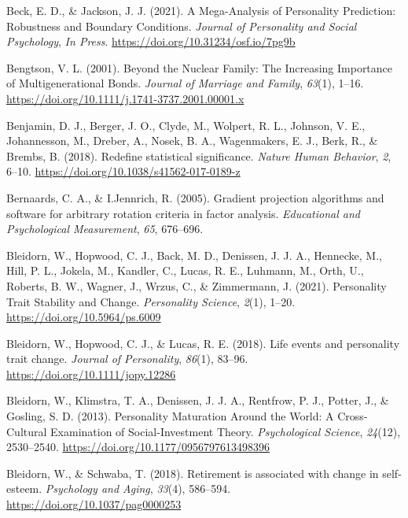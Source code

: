 \documentclass[
  english,
  man,floatsintext]{apa7}
\begin{document}
\leavevmode\hypertarget{ref-beckMegaAnalysisPersonalityPrediction2021}{}%
Beck, E. D., \& Jackson, J. J. (2021). A Mega-Analysis of Personality Prediction: Robustness and Boundary Conditions. \emph{Journal of Personality and Social Psychology}, \emph{In Press}. \url{https://doi.org/10.31234/osf.io/7pg9b}

\leavevmode\hypertarget{ref-bengtsonNuclearFamilyIncreasing2001}{}%
Bengtson, V. L. (2001). Beyond the Nuclear Family: The Increasing Importance of Multigenerational Bonds. \emph{Journal of Marriage and Family}, \emph{63}(1), 1--16. \url{https://doi.org/10.1111/j.1741-3737.2001.00001.x}

\leavevmode\hypertarget{ref-benjaminRedefineStatisticalSignificance2018}{}%
Benjamin, D. J., Berger, J. O., Clyde, M., Wolpert, R. L., Johnson, V. E., Johannesson, M., Dreber, A., Nosek, B. A., Wagenmakers, E. J., Berk, R., \& Brembs, B. (2018). Redefine statistical significance. \emph{Nature Human Behavior}, \emph{2}, 6--10. \url{https://doi.org/10.1038/s41562-017-0189-z}

\leavevmode\hypertarget{ref-R-GPArotation}{}%
Bernaards, C. A., \& I.Jennrich, R. (2005). Gradient projection algorithms and software for arbitrary rotation criteria in factor analysis. \emph{Educational and Psychological Measurement}, \emph{65}, 676--696.

\leavevmode\hypertarget{ref-bleidornPersonalityTraitStability2021}{}%
Bleidorn, W., Hopwood, C. J., Back, M. D., Denissen, J. J. A., Hennecke, M., Hill, P. L., Jokela, M., Kandler, C., Lucas, R. E., Luhmann, M., Orth, U., Roberts, B. W., Wagner, J., Wrzus, C., \& Zimmermann, J. (2021). Personality Trait Stability and Change. \emph{Personality Science}, \emph{2}(1), 1--20. \url{https://doi.org/10.5964/ps.6009}

\leavevmode\hypertarget{ref-bleidornLifeEventsPersonality2018}{}%
Bleidorn, W., Hopwood, C. J., \& Lucas, R. E. (2018). Life events and personality trait change. \emph{Journal of Personality}, \emph{86}(1), 83--96. \url{https://doi.org/10.1111/jopy.12286}

\leavevmode\hypertarget{ref-bleidornPersonalityMaturationWorld2013}{}%
Bleidorn, W., Klimstra, T. A., Denissen, J. J. A., Rentfrow, P. J., Potter, J., \& Gosling, S. D. (2013). Personality Maturation Around the World: A Cross-Cultural Examination of Social-Investment Theory. \emph{Psychological Science}, \emph{24}(12), 2530--2540. \url{https://doi.org/10.1177/0956797613498396}

\leavevmode\hypertarget{ref-bleidornRetirementAssociatedChange2018}{}%
Bleidorn, W., \& Schwaba, T. (2018). Retirement is associated with change in self-esteem. \emph{Psychology and Aging}, \emph{33}(4), 586--594. \url{https://doi.org/10.1037/pag0000253}
\end{document}
